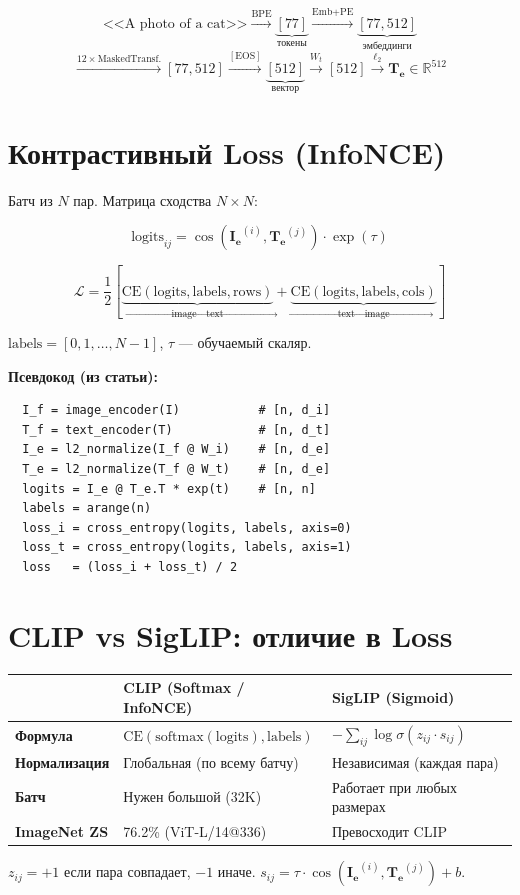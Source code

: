 \documentclass[12pt,a4paper]{article}
\begin{document}
\[
\text{<<A photo of a cat>>}
\xrightarrow{\text{BPE}}
\underbrace{[77]}_{\text{токены}}
\xrightarrow{\text{Emb}+\text{PE}}
\underbrace{[77, 512]}_{\text{эмбеддинги}}
\]
\[
\xrightarrow{12\times\text{MaskedTransf.}}
[77, 512]
\xrightarrow{[\mathrm{EOS}]}
\underbrace{[512]}_{\text{вектор}}
\xrightarrow{W_t}
[512]
\xrightarrow{\ell_2}
\boxed{\mathbf{T_e} \in \mathbb{R}^{512}}
\]


\section*{Контрастивный Loss (InfoNCE)}

Батч из $N$ пар. Матрица сходства $N\times N$:

\[
\text{logits}_{ij} = \cos(\mathbf{I_e}^{(i)}, \mathbf{T_e}^{(j)}) \cdot \exp(\tau)
\]

\[
\boxed{
\mathcal{L} = \frac{1}{2}\left[
  \underbrace{\mathrm{CE}(\text{logits}, \text{labels}, \text{rows})}_{\text{image} \to \text{text}}
  + \underbrace{\mathrm{CE}(\text{logits}, \text{labels}, \text{cols})}_{\text{text} \to \text{image}}
\right]
}
\]

$\text{labels} = [0, 1, \ldots, N\!-\!1]$, \quad $\tau$ --- обучаемый скаляр.

\bigskip

\noindent\textbf{Псевдокод (из статьи):}
\begin{verbatim}
  I_f = image_encoder(I)           # [n, d_i]
  T_f = text_encoder(T)            # [n, d_t]
  I_e = l2_normalize(I_f @ W_i)    # [n, d_e]
  T_e = l2_normalize(T_f @ W_t)    # [n, d_e]
  logits = I_e @ T_e.T * exp(t)    # [n, n]
  labels = arange(n)
  loss_i = cross_entropy(logits, labels, axis=0)
  loss_t = cross_entropy(logits, labels, axis=1)
  loss   = (loss_i + loss_t) / 2
\end{verbatim}


\section*{CLIP vs SigLIP: отличие в Loss}

\begin{center}
\begin{tabular}{p{2.5cm}p{5.5cm}p{5.5cm}}
\toprule
& \textbf{CLIP (Softmax / InfoNCE)} & \textbf{SigLIP (Sigmoid)} \\
\midrule
\textbf{Формула} &
  $\mathrm{CE}(\mathrm{softmax}(\text{logits}), \text{labels})$ &
  $-\sum_{ij} \log \sigma(z_{ij} \cdot s_{ij})$ \\[6pt]
\textbf{Нормализация} &
  Глобальная (по всему батчу) &
  Независимая (каждая пара) \\[6pt]
\textbf{Батч} &
  Нужен большой (32K) &
  Работает при любых размерах \\[6pt]
\textbf{ImageNet ZS} &
  76.2\% (ViT-L/14@336) &
  Превосходит CLIP \\
\bottomrule
\end{tabular}
\end{center}

\noindent$z_{ij} = +1$ если пара совпадает, $-1$ иначе.\quad
$s_{ij} = \tau \cdot \cos(\mathbf{I_e}^{(i)}, \mathbf{T_e}^{(j)}) + b$.
\end{document}
